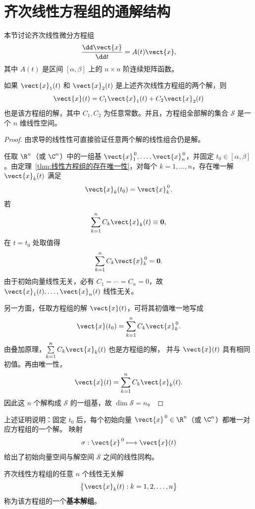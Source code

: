 \section{齐次线性方程组的通解结构}\label{sec:齐次线性方程组的通解结构}

本节讨论齐次线性微分方程组
\[
	\dfrac{\dd\vect{x}}{\dd t}=A(t)\vect{x},
\]
其中 $A(t)$ 是区间 $[\alpha,\beta]$ 上的 $n\times n$ 阶连续矩阵函数。

\begin{theorem}\label{thm:齐次线性方程组的解空间}
	如果 $\vect{x}_1(t)$ 和 $\vect{x}_2(t)$ 是上述齐次线性方程组的两个解，则
	\[
		\vect{x}(t)
		=C_1\vect{x}_1(t)+C_2\vect{x}_2(t)
	\]
	也是该方程组的解，其中 $C_1,C_2$ 为任意常数。并且，方程组全部解的集合
	$\mathcal{S}$ 是一个 $n$ 维线性空间。
\end{theorem}

\begin{proof}
	由求导的线性性可直接验证任意两个解的线性组合仍是解。

	任取 $\R^n$（或 $\C^n$）中的一组基
	$\vect{x}_1^{\,0},\ldots,\vect{x}_n^{\,0}$，并固定
	$t_0\in[\alpha,\beta]$。由定理~\ref{thm:线性方程组的存在唯一性}，对每个
	$k=1,\ldots,n$，存在唯一解 $\vect{x}_k(t)$ 满足
	\[
		\vect{x}_k(t_0)=\vect{x}_k^{\,0}.
	\]
	若
	\[
		\sum_{k=1}^{n}C_k\vect{x}_k(t)\equiv\boldsymbol{0},
	\]
	在 $t=t_0$ 处取值得
	\[
		\sum_{k=1}^{n}C_k\vect{x}_k^{\,0}=\boldsymbol{0}.
	\]
	由于初始向量线性无关，必有 $C_1=\cdots=C_n=0$，故
	$\vect{x}_1(t),\ldots,\vect{x}_n(t)$ 线性无关。

	另一方面，任取方程组的解 $\vect{x}(t)$，可将其初值唯一地写成
	\[
		\vect{x}(t_0)
		=\sum_{k=1}^{n}C_k\vect{x}_k^{\,0}.
	\]
	由叠加原理，$\sum\limits_{k=1}^{n}C_k\vect{x}_k(t)$ 也是方程组的解，
	并与 $\vect{x}(t)$ 具有相同初值。再由唯一性，
	\[
		\vect{x}(t)
		=\sum_{k=1}^{n}C_k\vect{x}_k(t).
	\]
	因此这 $n$ 个解构成 $\mathcal{S}$ 的一组基，故
	$\dim\mathcal{S}=n$。
\end{proof}

上述证明说明：固定 $t_0$ 后，每个初始向量
$\vect{x}^{\,0}\in\R^n$（或 $\C^n$）都唯一对应方程组的一个解。
映射
\[
	\sigma:\vect{x}^{\,0}\longmapsto\vect{x}(t)
\]
给出了初始向量空间与解空间 $\mathcal{S}$ 之间的线性同构。

\begin{definition}\label{def:基本解组}
	齐次线性方程组的任意 $n$ 个线性无关解
	\[
		\bigl\{\vect{x}_k(t):k=1,2,\ldots,n\bigr\}
	\]
	称为该方程组的一个\textbf{基本解组}。
\end{definition}

